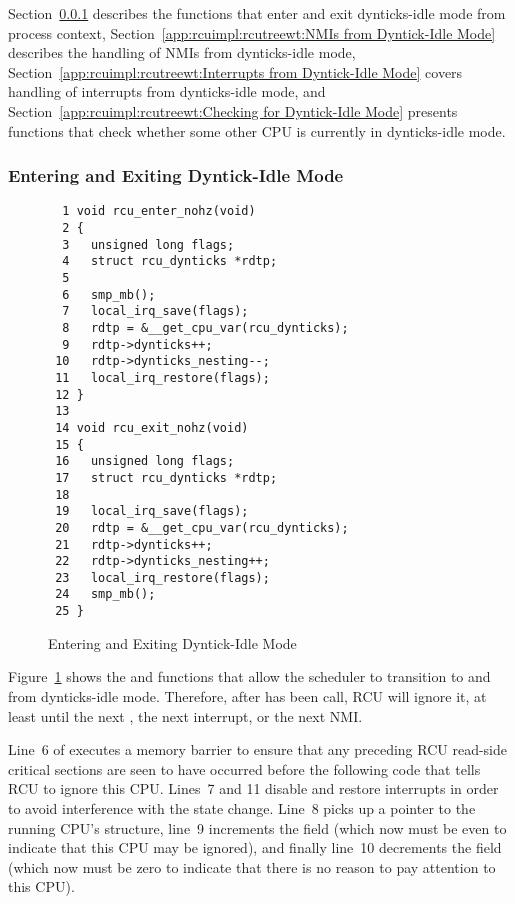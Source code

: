 Section~\ref{app:rcuimpl:rcutreewt:Entering and Exiting Dyntick-Idle Mode}
describes the functions that enter and exit dynticks-idle mode from
process context,
Section~\ref{app:rcuimpl:rcutreewt:NMIs from Dyntick-Idle Mode}
describes the handling of NMIs from dynticks-idle mode,
Section~\ref{app:rcuimpl:rcutreewt:Interrupts from Dyntick-Idle Mode}
covers handling of interrupts from dynticks-idle mode, and
Section~\ref{app:rcuimpl:rcutreewt:Checking for Dyntick-Idle Mode}
presents functions that check whether some other CPU is currently in
dynticks-idle mode.

\subsubsection{Entering and Exiting Dyntick-Idle Mode}
\label{app:rcuimpl:rcutreewt:Entering and Exiting Dyntick-Idle Mode}

\begin{figure}[tbp]
{ \scriptsize
\begin{verbatim}
  1 void rcu_enter_nohz(void)
  2 {
  3   unsigned long flags;
  4   struct rcu_dynticks *rdtp;
  5
  6   smp_mb();
  7   local_irq_save(flags);
  8   rdtp = &__get_cpu_var(rcu_dynticks);
  9   rdtp->dynticks++;
 10   rdtp->dynticks_nesting--;
 11   local_irq_restore(flags);
 12 }
 13
 14 void rcu_exit_nohz(void)
 15 {
 16   unsigned long flags;
 17   struct rcu_dynticks *rdtp;
 18
 19   local_irq_save(flags);
 20   rdtp = &__get_cpu_var(rcu_dynticks);
 21   rdtp->dynticks++;
 22   rdtp->dynticks_nesting++;
 23   local_irq_restore(flags);
 24   smp_mb();
 25 }
\end{verbatim}
}
\caption{Entering and Exiting Dyntick-Idle Mode}
\label{fig:app:rcuimpl:rcutreewt:Entering and Exiting Dyntick-Idle Mode}
\end{figure}

Figure~\ref{fig:app:rcuimpl:rcutreewt:Entering and Exiting Dyntick-Idle Mode}
shows the  and  functions
that allow the scheduler to transition to and from dynticks-idle
mode.
Therefore, after  has been call, RCU will ignore
it, at least until the next , the next interrupt,
or the next NMI.

Line~6 of  executes a memory barrier to ensure
that any preceding RCU read-side critical sections are seen to have
occurred before the following code that tells RCU to ignore this CPU.
Lines~7 and 11 disable and restore interrupts in order to avoid
interference with the state change.
Line~8 picks up a pointer to the running CPU's 
structure, line~9 increments the  field (which now
must be even to indicate that this CPU may be ignored), and finally line~10
decrements the  field (which now must be
zero to indicate that there is no reason to pay attention to this CPU).


